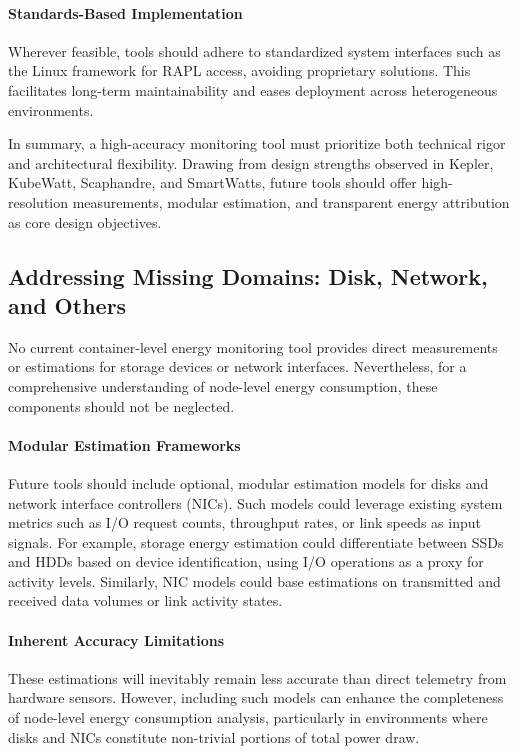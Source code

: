 \paragraph{Standards-Based Implementation}
Wherever feasible, tools should adhere to standardized system interfaces such as the Linux  framework for RAPL access, avoiding proprietary solutions. This facilitates long-term maintainability and eases deployment across heterogeneous environments.

In summary, a high-accuracy monitoring tool must prioritize both technical rigor and architectural flexibility. Drawing from design strengths observed in Kepler, KubeWatt, Scaphandre, and SmartWatts, future tools should offer high-resolution measurements, modular estimation, and transparent energy attribution as core design objectives.

\subsection{Addressing Missing Domains: Disk, Network, and Others}
\label{sec:future-missing-domains}

No current container-level energy monitoring tool provides direct measurements or estimations for storage devices or network interfaces. Nevertheless, for a comprehensive understanding of node-level energy consumption, these components should not be neglected.

\paragraph{Modular Estimation Frameworks}
Future tools should include optional, modular estimation models for disks and network interface controllers (NICs). Such models could leverage existing system metrics such as I/O request counts, throughput rates, or link speeds as input signals. For example, storage energy estimation could differentiate between SSDs and HDDs based on device identification, using I/O operations as a proxy for activity levels. Similarly, NIC models could base estimations on transmitted and received data volumes or link activity states.

\paragraph{Inherent Accuracy Limitations}
These estimations will inevitably remain less accurate than direct telemetry from hardware sensors. However, including such models can enhance the completeness of node-level energy consumption analysis, particularly in environments where disks and NICs constitute non-trivial portions of total power draw.


